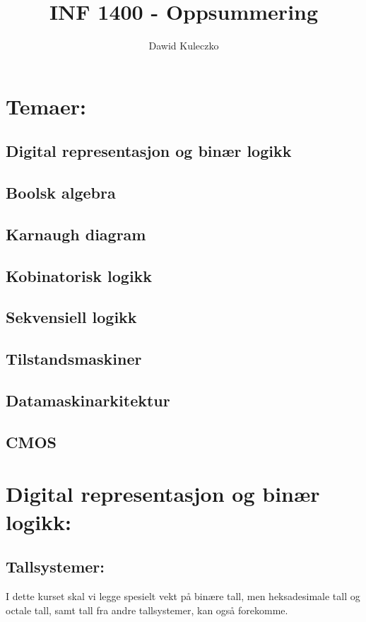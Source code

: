 \documentclass{article}
\begin{document}
	\title{INF 1400 - Oppsummering}
	\author{Dawid Kuleczko}
	\maketitle	
	
	\section*{Temaer:}
	\subsection*{Digital representasjon og binær logikk}
	\subsection*{Boolsk algebra}
	\subsection*{Karnaugh diagram}
	\subsection*{Kobinatorisk logikk}
	\subsection*{Sekvensiell logikk}
	\subsection*{Tilstandsmaskiner}
	\subsection*{Datamaskinarkitektur}
	\subsection*{CMOS}
	\quad
	
	\section*{Digital representasjon og binær logikk:}
	\subsection*{Tallsystemer:}
	
	I dette kurset skal vi legge spesielt vekt på binære tall, men heksadesimale tall og octale tall, samt tall fra andre tallsystemer, kan også forekomme.
	
\end{document}
